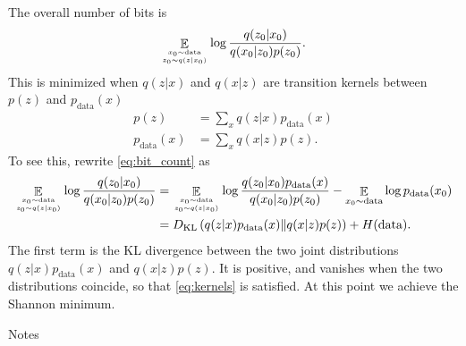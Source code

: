 \documentclass[preprint,notitlepage]{revtex4-1}
\DeclareMathOperator*{\E}{\mathbb{E}}
\begin{document}
The overall number of bits is
%
\begin{equation}\label{eq:bit_count}
  \E_{x_0\sim\text{data} \atop z_0 \sim q(z|x_0)} \log\frac{q(z_0|x_0)}{q(x_0|z_0)p(z_0)}.
\end{equation}
%
This is minimized when $q(z|x)$ and $q(x|z)$ are transition kernels between $p(z)$ and $p_\text{data}(x)$
%
\begin{align}\label{eq:kernels}
  p(z) &= \sum_x q(z|x) p_\text{data}(x)\\
  p_\text{data}(x) &= \sum_x q(x|z) p(z).
\end{align}
%
To see this, rewrite \eqref{eq:bit_count} as
%
\begin{align}
  \E_{x_0\sim\text{data} \atop z_0 \sim q(z|x_0)} \log\frac{q(z_0|x_0)}{q(x_0|z_0)p(z_0)} &= \E_{x_0\sim\text{data} \atop z_0 \sim q(z|x_0)} \log\frac{q(z_0|x_0)p_\text{data}(x)}{q(x_0|z_0)p(z_0)} - \E_{x_0\sim \text{data}} \log p_\text{data}(x_0)\\
  &= D_{\text{KL}}\left(q(z|x)p_\text{data}(x) \middle\| q(x|z)p(z)\right) + H(\text{data}).
\end{align}
%
The first term is the KL divergence between the two joint distributions $q(z|x)p_\text{data}(x)$ and $q(x|z)p(z)$. It is positive, and vanishes when the two distributions coincide, so that \eqref{eq:kernels} is satisfied. At this point we achieve the Shannon minimum.

Notes
\end{document}
